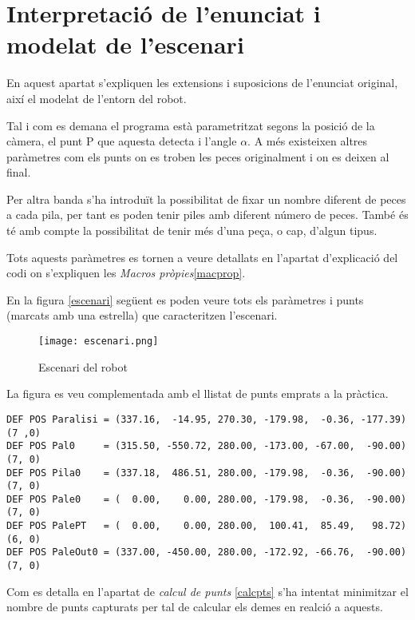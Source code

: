 \section{Interpretació de l'enunciat i modelat de l'escenari}
En aquest apartat s'expliquen les extensions i suposicions de l'enunciat original,
així el modelat de l'entorn del robot.

Tal i com es demana el programa està parametritzat segons la posició de la càmera,
el punt P que aquesta detecta i l'angle $\alpha$. A més existeixen altres paràmetres
com els punts on es troben les peces originalment i on es deixen al final.

Per altra banda s'ha introduït la possibilitat de fixar un nombre diferent de peces
a cada pila, per tant es poden tenir piles amb diferent número de peces. També
és té amb compte la possibilitat de tenir més d'una peça, o cap, d'algun tipus.

Tots aquests paràmetres es tornen a veure detallats en l'apartat d'explicació del
codi on s'expliquen les \emph{Macros pròpies}\ref{macprop}.

En la figura \ref{escenari} següent es poden veure tots els paràmetres i punts
(marcats amb una estrella) que caracteritzen l'escenari.

\begin{figure}[H]
\begin{center}\label{fig:escenari}
 \texttt{[image: escenari.png]}
\end{center}
  \caption{Escenari del robot}
\end{figure}

La figura es veu complementada amb el llistat de punts emprats a la pràctica.

\begin{verbatim}
DEF POS Paralisi = (337.16,  -14.95, 270.30, -179.98,  -0.36, -177.39)(7 ,0)
DEF POS Pal0     = (315.50, -550.72, 280.00, -173.00, -67.00,  -90.00)(7, 0)
DEF POS Pila0    = (337.18,  486.51, 280.00, -179.98,  -0.36,  -90.00)(7, 0)
DEF POS Pale0    = (  0.00,    0.00, 280.00, -179.98,  -0.36,  -90.00)(7, 0)
DEF POS PalePT   = (  0.00,    0.00, 280.00,  100.41,  85.49,   98.72)(6, 0)
DEF POS PaleOut0 = (337.00, -450.00, 280.00, -172.92, -66.76,  -90.00)(7, 0)
\end{verbatim}

Com es detalla en l'apartat de \emph{calcul de punts} \ref{calcpts}
s'ha intentat minimitzar el nombre de punts capturats per tal
de calcular els demes en realció a aquests.

